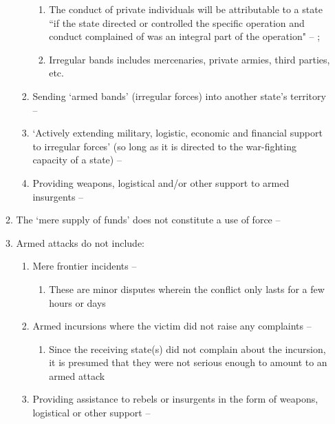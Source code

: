 \begin{enumerate}
\begin{enumerate}
\begin{enumerate}
\begin{enumerate}
                \item The conduct of private individuals will be attributable to a state ``if the state directed or controlled the specific operation and conduct complained of was an integral part of the operation" -- ; 
                \item Irregular bands includes mercenaries, private armies, third parties, etc.
            \end{enumerate}
            \item Sending `armed bands' (irregular forces) into another state's territory -- 
            \item `Actively extending military, logistic, economic and financial support to irregular forces' (so long as it is directed to the war-fighting capacity of a state) -- 
            \item Providing weapons, logistical and/or other support to armed insurgents -- 
            \end{enumerate}
            \item The `mere supply of funds' does not constitute a use of force -- 
            \item Armed attacks do not include:
            \begin{enumerate}
                \item Mere frontier incidents -- 
                \begin{enumerate}
                    \item These are minor disputes wherein the conflict only lasts for a few hours or days
                \end{enumerate}
                \item Armed incursions where the victim did not raise any complaints -- 
                \begin{enumerate}
                    \item Since the receiving state(s) did not complain about the incursion, it is presumed that they were not serious enough to amount to an armed attack
                \end{enumerate}
                \item Providing assistance to rebels or insurgents in the form of weapons, logistical or other support -- 

\end{enumerate}
\end{enumerate}
\end{enumerate}
